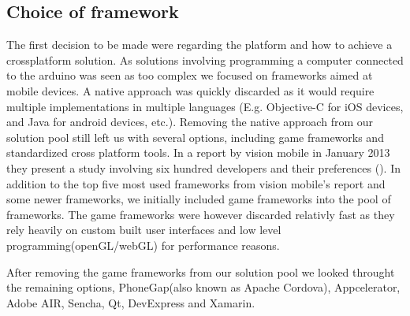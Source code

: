 \subsection*{Choice of framework}
	The first decision to be made were regarding the platform and how to achieve a crossplatform solution. 
	As solutions involving programming a computer connected to the arduino was seen as too complex we focused on frameworks aimed at mobile devices. 
	A native approach was quickly discarded as it would require multiple implementations in multiple languages (E.g. Objective-C for iOS devices, and Java for android devices, etc.). 
	Removing the native approach from our solution pool still left us with several options, including game frameworks and standardized cross platform tools.
	In a report by vision mobile in January 2013 they present a study involving six hundred developers and their preferences (\cite{developerCPT}). 
	In addition to the top five most used frameworks from vision mobile's report and some newer frameworks, we initially included game frameworks into the pool of frameworks. 
	The game frameworks were however discarded relativly fast as they rely heavily on custom built user interfaces and low level programming(openGL/webGL) for performance reasons.
	
	\bigskip\noindent
	After removing the game frameworks from our solution pool we looked throught the remaining options, PhoneGap(also known as Apache Cordova), Appcelerator, Adobe AIR, Sencha, Qt, DevExpress and Xamarin.
	
	
